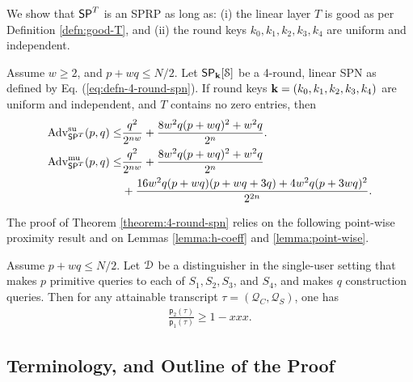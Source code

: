 We show that $\mathsf{SP}^T$ is an SPRP as long as: (i) the linear layer $T$ is good as per Definition \ref{defn:good-T}, and (ii) the round keys $k_0,k_1,k_2,k_3,k_4$ are uniform and independent.

\begin{theorem}
\label{theorem:4-round-spn}

Assume $w\geq2$, and $p+wq\leq N/2$. Let $\mathsf{SP}_{\mathbf{k}}[\mathcal{S}]$ be a 4-round, linear SPN as defined by Eq. (\ref{eq:defn-4-round-spn}). If round keys $\mathbf{k}=(k_0,k_1,k_2,k_3,k_4)$ are uniform and independent, and $T$ contains no zero entries, then
%
\begin{align}
\operatorname{Adv}_{\mathsf{SP}^T}^{\mathrm{su}}(p, q) \leq& \frac{q^2}{2^{n w}} + \frac{8 w^2 q(p+wq)^2+w^2 q}{2^n}   .  
\notag   \\
\operatorname{Adv}_{\mathsf{SP}^T}^{\mathrm{mu}}(p, q) \leq& \frac{q^2}{2^{n w}} + \frac{8 w^2 q(p+wq)^2+w^2 q}{2^n}    \notag   \\
&+ \frac{16 w^2 q(p+w q)(p+w q +3 q)+4 w^2 q(p+3 wq)^2}{2^{2 n}}.
\notag
\end{align}
\end{theorem}
The proof of Theorem \ref{theorem:4-round-spn} relies on the following point-wise proximity result and on Lemmas \ref{lemma:h-coeff} and \ref{lemma:point-wise}.


\begin{lemma}
	\label{lemma:proximity-4-round}
	
	Assume $p+wq\leq N/2$. Let $\mathcal{D}$ be a distinguisher in the single-user setting that makes $p$ primitive queries to each of $S_1,S_2,S_3$, and $S_4$, and makes $q$ construction queries. Then for any attainable
	transcript $\tau=(\mathcal{Q}_C,\mathcal{Q}_S)$, one has
	\begin{align}
	\frac{\mathsf{p}_{2}(\tau)}{\mathsf{p}_{1}(\tau)}
	\geq 1 - xxx.
	\label{eq:bound-proximity-4-round}
	\end{align}
\end{lemma}




\subsection{Terminology, and Outline of the Proof}
\label{sec:proof-sketch-4-rounds}

